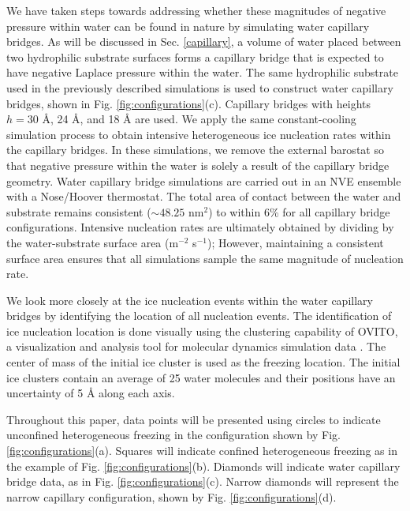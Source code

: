 \documentclass[journal abbreviation, manuscript]{copernicus}
\begin{document}
We have taken steps towards addressing whether these magnitudes of negative pressure within water can be found in nature by simulating water capillary bridges. As will be discussed in Sec. \ref{capillary}, a volume of water placed between two hydrophilic substrate surfaces forms a capillary bridge that is expected to have negative Laplace pressure within the water. The same hydrophilic substrate used in the previously described simulations is used to construct water capillary bridges, shown in Fig. \ref{fig:configurations}(c). Capillary bridges with heights $h = 30$ \AA{}, 24 \AA{}, and 18 \AA{} are used. We apply the same constant-cooling simulation process to obtain intensive heterogeneous ice nucleation rates within the capillary bridges. In these simulations, we remove the external barostat so that negative pressure within the water is solely a result of the capillary bridge geometry. Water capillary bridge simulations are carried out in an NVE ensemble with a Nose/Hoover thermostat. The total area of contact between the water and substrate remains consistent ($\sim 48.25$ nm$^2$) to within 6\% for all capillary bridge configurations. Intensive nucleation rates are ultimately obtained by dividing by the water-substrate surface area (m$^{-2}$ s$^{-1}$); However, maintaining a consistent surface area ensures that all simulations sample the same magnitude of nucleation rate.

We look more closely at the ice nucleation events within the water capillary bridges by identifying the location of all nucleation events. The identification of ice nucleation location is done visually using the clustering capability of OVITO, a visualization and analysis tool for molecular dynamics simulation data \citep{ovito}. The center of mass of the initial ice cluster is used as the freezing location. The initial ice clusters contain an average of 25 water molecules and their positions have an uncertainty of 5 \AA{} along each axis.

Throughout this paper, data points will be presented using circles to indicate unconfined heterogeneous freezing in the configuration shown by Fig. \ref{fig:configurations}(a). Squares will indicate confined heterogeneous freezing as in the example of Fig. \ref{fig:configurations}(b). Diamonds will indicate water capillary bridge data, as in Fig. \ref{fig:configurations}(c). Narrow diamonds will represent the narrow capillary configuration, shown by Fig. \ref{fig:configurations}(d).

\end{document}
